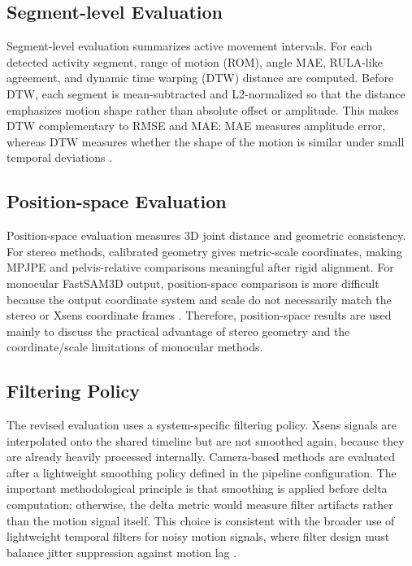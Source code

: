 \documentclass[12pt,a4paper]{article}
\begin{document}
\subsection{Segment-level Evaluation}

Segment-level evaluation summarizes active movement intervals.
For each detected activity segment, range of motion (ROM), angle MAE, RULA-like
agreement, and dynamic time warping (DTW) distance are computed.
Before DTW, each segment is mean-subtracted and L2-normalized so that the
distance emphasizes motion shape rather than absolute offset or amplitude.
This makes DTW complementary to RMSE and MAE: MAE measures amplitude error,
whereas DTW measures whether the shape of the motion is similar under small
temporal deviations \cite{sakoe1978dtw}.

\subsection{Position-space Evaluation}

Position-space evaluation measures 3D joint distance and geometric consistency.
For stereo methods, calibrated geometry gives metric-scale coordinates, making
MPJPE and pelvis-relative comparisons meaningful after rigid alignment.
For monocular FastSAM3D output, position-space comparison is more difficult
because the output coordinate system and scale do not necessarily match the
stereo or Xsens coordinate frames \cite{kabsch1976solution}.
Therefore, position-space results are used mainly to discuss the practical
advantage of stereo geometry and the coordinate/scale limitations of monocular
methods.

\subsection{Filtering Policy}

The revised evaluation uses a system-specific filtering policy.
Xsens signals are interpolated onto the shared timeline but are not smoothed
again, because they are already heavily processed internally.
Camera-based methods are evaluated after a lightweight smoothing policy
defined in the pipeline configuration.
The important methodological principle is that smoothing is applied before
delta computation; otherwise, the delta metric would measure filter artifacts
rather than the motion signal itself.
This choice is consistent with the broader use of lightweight temporal filters
for noisy motion signals, where filter design must balance jitter suppression
against motion lag \cite{casiez2012oneeuro}.
\end{document}

